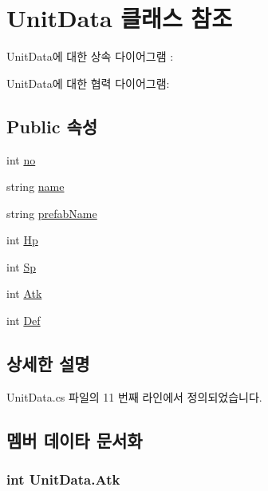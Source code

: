 \hypertarget{class_unit_data}{}\section{Unit\+Data 클래스 참조}
\label{class_unit_data}


Unit\+Data에 대한 상속 다이어그램 \+: 


Unit\+Data에 대한 협력 다이어그램\+:
\subsection*{Public 속성}
\begin{DoxyCompactItemize}
\item 
int \hyperlink{class_unit_data_a45de9d7b5ceb45a81feca29b67e1c46c}{no}
\item 
string \hyperlink{class_unit_data_a7aa329703ed47d3d717cbe3343133ad8}{name}
\item 
string \hyperlink{class_unit_data_a1523fa01f295711683596fec6f3268e5}{prefab\+Name}
\item 
int \hyperlink{class_unit_data_a4eab1aa57a762cf2df5053d678a4c788}{Hp}
\item 
int \hyperlink{class_unit_data_afb0acf2fc188d92dfac3a7377794f72f}{Sp}
\item 
int \hyperlink{class_unit_data_a28383a219f3d935026e359f833ba1770}{Atk}
\item 
int \hyperlink{class_unit_data_a226d1ebed11200b155e66ea3d5189321}{Def}
\end{DoxyCompactItemize}


\subsection{상세한 설명}


Unit\+Data.\+cs 파일의 11 번째 라인에서 정의되었습니다.



\subsection{멤버 데이타 문서화}
\subsubsection[{\texorpdfstring{Atk}{Atk}}]{\setlength{\rightskip}{0pt plus 5cm}int Unit\+Data.\+Atk}\hypertarget{class_unit_data_a28383a219f3d935026e359f833ba1770}{}\label{class_unit_data_a28383a219f3d935026e359f833ba1770}


